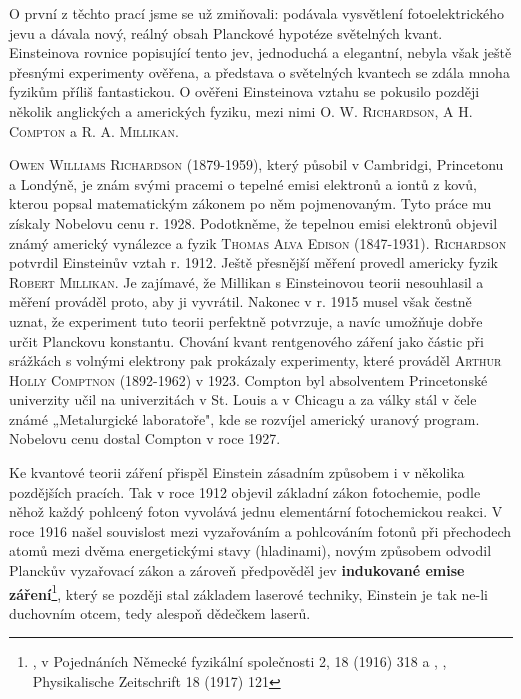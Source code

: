         O první z těchto prací jsme se už zmiňovali: podávala vysvětlení fotoelektrického jevu a
        dávala nový, reálný obsah Planckové hypotéze světelných kvant. Einsteinova rovnice
        popisující tento jev, jednoduchá a elegantní, nebyla však ještě přesnými experimenty
        ověřena, a představa o světelných kvantech se zdála mnoha fyzikům příliš fantastickou. O
        ověřeni Einsteinova vztahu se pokusilo později několik anglických a amerických fyziku, mezi
        nimi \textsc{O. W. Richardson}, \textsc{A H. Compton} a \textsc{R. A. Millikan}.

        \begin{tcnote}
          \textsc{Owen Williams Richardson} (1879-1959), který působil v Cambridgi, Princetonu a
          Londýně, je znám svými pracemi o tepelné emisi elektronů a iontů z kovů, kterou popsal
          matematickým zákonem po něm pojmenovaným. Tyto práce mu získaly Nobelovu cenu r. 1928.
          Podotkněme, že tepelnou emisi elektronů objevil známý americký vynálezce a fyzik
          \textsc{Thomas Alva Edison} (1847-1931). \textsc{Richardson} potvrdil Einsteinův vztah r.
          1912. Ještě přesnější měření provedl americky fyzik \textsc{Robert Millikan}. Je zajímavé,
          že Millikan s Einsteinovou teorii nesouhlasil a měření prováděl proto, aby ji vyvrátil.
          Nakonec v r. 1915 musel však čestně uznat, že experiment tuto teorii perfektně potvrzuje,
          a navíc umožňuje dobře určit Planckovu konstantu. Chování kvant rentgenového záření jako
          částic při srážkách s volnými elektrony pak prokázaly experimenty, které prováděl
          \textsc{Arthur Holly Comptnon} (1892-1962) v 1923. Compton byl absolventem Princetonské
          univerzity učil na univerzitách v St. Louis a v Chicagu a za války stál v čele známé
          „Metalurgické laboratoře", kde se rozvíjel americký uranový program. Nobelovu cenu dostal
          Compton v roce 1927.
        \end{tcnote}

        Ke kvantové teorii záření přispěl Einstein zásadním způsobem i v několika pozdějších
        pracích. Tak v roce 1912 objevil základní zákon fotochemie, podle něhož každý pohlcený foton
        vyvolává jednu elementární fotochemickou reakci. V roce 1916 našel souvislost mezi
        vyzařováním a pohlcováním fotonů při přechodech atomů mezi dvěma energetickými stavy
        (hladinami), novým způsobem odvodil Planckův vyzařovací zákon a zároveň předpověděl jev
        \textbf{indukované emise záření}\footnote{ ,  v Pojednáních
        Německé fyzikální společnosti 2, 18 (1916) 318 a , , Physikalische Zeitschrift 18 (1917) 121}, který se později
        stal základem laserové techniky, Einstein je tak ne-li duchovním otcem, tedy alespoň
        dědečkem laserů.

